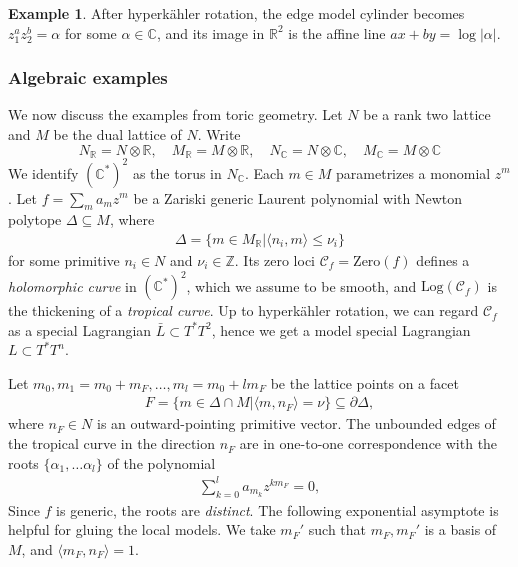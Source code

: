 \documentclass{article}
\theoremstyle{definition}
\newtheorem{eg}[thm]{Example}
\newcommand{\R}{\mathbb{R}}
\newcommand{\C}{\mathbb{C}}
\begin{document}
	
	
	
	
	
	
	\begin{eg}
		After hyperk\"ahler rotation, the edge model cylinder becomes $z_1^az_2^b=\alpha$ for some $\alpha\in \mathbb{C}$, and its image in $\R^2$ is the affine line $ax+by=\log{|\alpha|}$.
	\end{eg}
	
	
	
	\subsubsection{Algebraic examples}
	
	
	We now discuss the examples from toric geometry.
	Let $N$ be a rank two lattice and $M$ be the dual lattice of $N$. Write 
	\[
	N_{\mathbb{R}}=N\otimes \mathbb{R},\quad M_{\mathbb{R}}=M\otimes \mathbb{R}, \quad N_{\mathbb{C}}=N\otimes \mathbb{C},\quad M_{\mathbb{C}}=M\otimes \mathbb{C}
	\] 
	We identify  $(\mathbb{C}^*)^2$ as the torus in $N_\C$. Each $m\in M$ parametrizes a monomial $z^m$. Let $f=\sum_m a_m z^m$ be a Zariski generic Laurent polynomial with Newton polytope $\Delta\subseteq M$, where
	\begin{align*}
		\Delta=\{m\in M_{\mathbb{R}}|\langle n_i,m\rangle \leq \nu_i\}
	\end{align*} for some primitive $n_i\in N$ and $\nu_i\in \mathbb{Z}$.
	Its zero loci $\mathcal{C}_f= \text{Zero}(f)$ defines a \emph{holomorphic curve} in $(\mathbb{C}^*)^2$, which we assume to be smooth, and $\mbox{Log}(\mathcal{C}_f)$ is the thickening of a \emph{tropical curve}. Up to hyperk\"ahler rotation, we can regard $\mathcal{C}_f$ as a special Lagrangian $\bar{L}\subset T^*T^2$, hence we get a model special Lagrangian $L\subset T^*T^n$. 
	
	
	
	
	
	Let $m_0, m_1= m_0+ m_F, \ldots, m_l= m_0+ l m_F$ be the lattice points on a facet 
	\begin{align*}
		F=\{m\in \Delta\cap M|\langle m, n_F\rangle=\nu \}\subseteq\partial \Delta,
	\end{align*}
	where $n_F\in N$ is an outward-pointing primitive vector. The unbounded edges of the tropical curve in the direction $n_F$ are in one-to-one correspondence with the roots $\{ \alpha_1,\ldots \alpha_l\}$ of the polynomial
	\begin{align*}
		\sum_{k=0}^l a_{m_k}z^{k m_F}=0,
	\end{align*} 
	Since $f$ is generic, the roots are \emph{distinct}. 
	The following exponential asymptote is helpful for gluing the local models. We take $m_F'$ such that $m_F, m_F'$ is a basis of $M$, and $\langle m_F, n_F\rangle=1$. 
	
\end{document}
